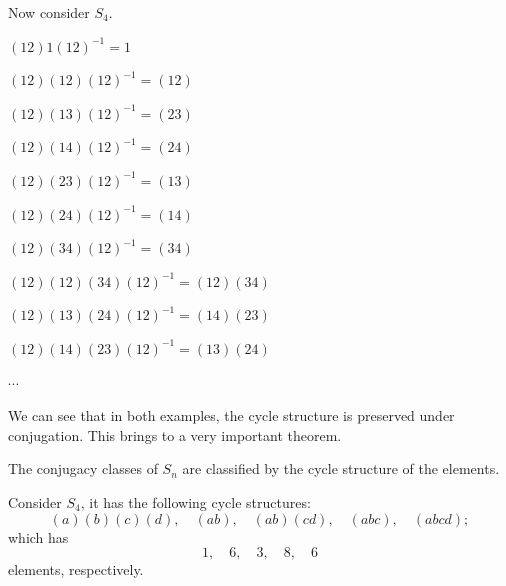 \begin{example}
    Now consider $S_4$. 

    \begin{minipage}[t]{0.45\linewidth} \begin{listu}
        \item $(12) 1 (12)^{-1} = 1$
        \item $(12) (12) (12)^{-1} = (12)$
        \item $(12) (13) (12)^{-1} = (23)$
        \item $(12) (14) (12)^{-1} = (24)$
        \item $(12) (23) (12)^{-1} = (13)$
        \item $(12) (24) (12)^{-1} = (14)$
    \end{listu} \end{minipage}
    \begin{minipage}[t]{0.45\linewidth} \begin{listu}
        \item $(12) (34) (12)^{-1} = (34)$
        \item $(12) (12)(34) (12)^{-1} = (12)(34)$
        \item $(12) (13)(24) (12)^{-1} = (14)(23)$
        \item $(12) (14)(23) (12)^{-1} = (13)(24)$
        \item $\cdots$
    \end{listu} \end{minipage}

    We can see that in both examples, the cycle structure is preserved under conjugation. This brings to a very important theorem.
\end{example}

\begin{theorem}
    The conjugacy classes of $S_n$ are classified by the cycle structure of the elements.
\end{theorem}

\begin{example}
    Consider $S_4$, it has the following cycle structures: \[
        (a)(b)(c)(d), \quad (ab), \quad (ab)(cd), \quad (abc), \quad (abcd);
    \] which has \[
        1, \quad 6, \quad 3, \quad 8, \quad 6
    \] elements, respectively.
\end{example}

